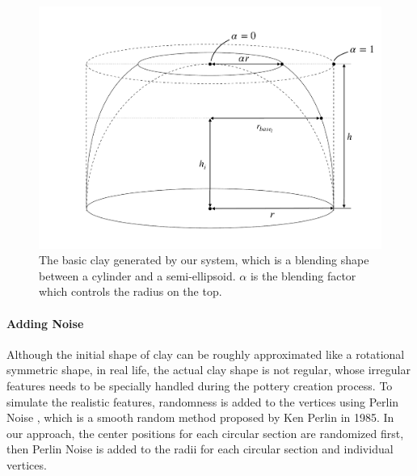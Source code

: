 \documentclass{svjour3}                     %
\begin{document}
\begin{figure}
\includegraphics[width=\textwidth]{fig4.pdf}
\caption{The basic clay generated by our system, which is a blending shape between a cylinder and a semi-ellipsoid. $\alpha$ is the blending factor which controls the radius on the top.}
\label{fig:base}
\end{figure}

\paragraph{Adding Noise} Although the initial shape of clay can be roughly approximated like a rotational symmetric shape, in real life, the actual clay shape is not regular, whose irregular features needs to be specially handled during the pottery creation process. To simulate the realistic features, randomness is added to the vertices using Perlin Noise \cite{Perlin1985An}, which is a smooth random method proposed by Ken Perlin in 1985.
In our approach, the center positions for each circular section are randomized first, then Perlin Noise is added to the radii for each circular section and individual vertices.
\end{document}
